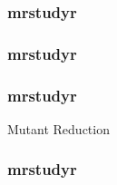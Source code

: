   \begin{frame}
    \frametitle{mrstudyr}
    \begin{figure}[!htb]
    \centering
    
    \end{figure}
  \end{frame}

  \begin{frame}
    \frametitle{mrstudyr}
    \centering
    {\fontsize{40}{40}\selectfont{Retrospective Mutant Reduction}}
  \end{frame}

  \begin{frame}
    \frametitle{mrstudyr}
    \centering
    {\fontsize{40}{40}\selectfont{\textcolor{solarizedViolet}{Retrospective}} Mutant Reduction}
  \end{frame}

  \begin{frame}
    \frametitle{mrstudyr}
    \centering
    {\fontsize{40}{40}}
  \end{frame}
